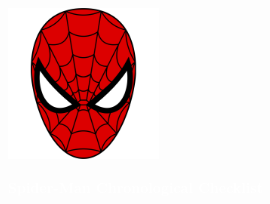 \documentclass[12pt]{article}
\begin{document}
\newpage
{}

\begin{center}
    \includegraphics[width=0.3\textwidth]{spiderman.png}
\end{center}

\vspace{1em}

\begin{center}
    {\Huge \textbf{\textcolor{white}{Spider-Man Chronological Checklist}}}
\end{center}

\vspace{2em}
\end{document}
